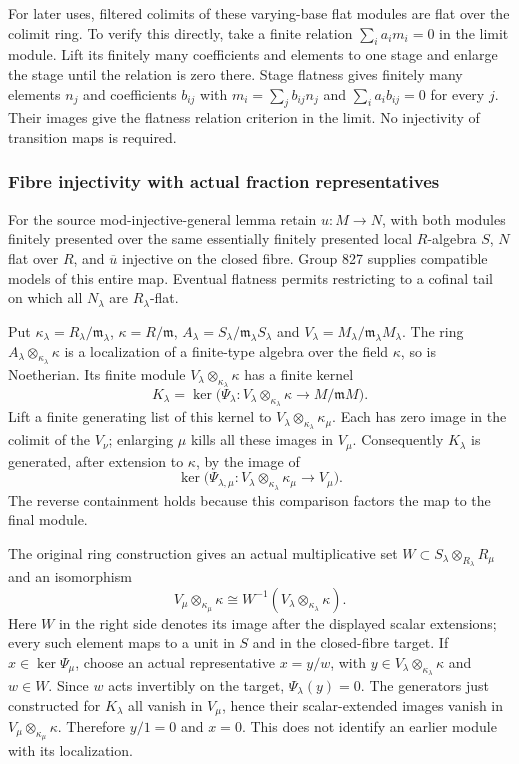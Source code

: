 For later uses, filtered colimits of these varying-base flat modules are flat over the colimit ring. To verify this directly, take a finite relation \(\sum_i a_i m_i=0\) in the limit module. Lift its finitely many coefficients and elements to one stage and enlarge the stage until the relation is zero there. Stage flatness gives finitely many elements \(n_j\) and coefficients \(b_{ij}\) with \(m_i=\sum_jb_{ij}n_j\) and \(\sum_i a_i b_{ij}=0\) for every \(j\). Their images give the flatness relation criterion in the limit. No injectivity of transition maps is required.

\subsubsection{Fibre injectivity with actual fraction representatives}\label{algebra-proof-038-fibre-injectivity-with-actual-fraction-representatives}

For the source mod-injective-general lemma retain \(u:M\to N\), with both modules finitely presented over the same essentially finitely presented local \(R\)-algebra \(S\), \(N\) flat over \(R\), and \(\overline u\) injective on the closed fibre. Group 827 supplies compatible models of this entire map. Eventual flatness permits restricting to a cofinal tail on which all \(N_\lambda\) are \(R_\lambda\)-flat.

Put \(\kappa_\lambda=R_\lambda/\mathfrak m_\lambda\), \(\kappa=R/\mathfrak m\), \(A_\lambda=S_\lambda/\mathfrak m_\lambda S_\lambda\) and \(V_\lambda=M_\lambda/\mathfrak m_\lambda M_\lambda\). The ring \(A_\lambda\otimes_{\kappa_\lambda}\kappa\) is a localization of a finite-type algebra over the field \(\kappa\), so is Noetherian. Its finite module \(V_\lambda\otimes_{\kappa_\lambda}\kappa\) has a finite kernel \[
K_\lambda=\ker\bigl(\Psi_\lambda:
 V_\lambda\otimes_{\kappa_\lambda}\kappa\longrightarrow M/\mathfrak mM\bigr).
\] Lift a finite generating list of this kernel to \(V_\lambda\otimes_{\kappa_\lambda}\kappa_\mu\). Each has zero image in the colimit of the \(V_\nu\); enlarging \(\mu\) kills all these images in \(V_\mu\). Consequently \(K_\lambda\) is generated, after extension to \(\kappa\), by the image of \[
\ker\bigl(\Psi_{\lambda,\mu}:
 V_\lambda\otimes_{\kappa_\lambda}\kappa_\mu\longrightarrow V_\mu\bigr).
\] The reverse containment holds because this comparison factors the map to the final module.

The original ring construction gives an actual multiplicative set \(W\subset S_\lambda\otimes_{R_\lambda}R_\mu\) and an isomorphism \[
V_\mu\otimes_{\kappa_\mu}\kappa
 \cong W^{-1}(V_\lambda\otimes_{\kappa_\lambda}\kappa).
\] Here \(W\) in the right side denotes its image after the displayed scalar extensions; every such element maps to a unit in \(S\) and in the closed-fibre target. If \(x\in\ker\Psi_\mu\), choose an actual representative \(x=y/w\), with \(y\in V_\lambda\otimes_{\kappa_\lambda}\kappa\) and \(w\in W\). Since \(w\) acts invertibly on the target, \(\Psi_\lambda(y)=0\). The generators just constructed for \(K_\lambda\) all vanish in \(V_\mu\), hence their scalar-extended images vanish in \(V_\mu\otimes_{\kappa_\mu}\kappa\). Therefore \(y/1=0\) and \(x=0\). This does not identify an earlier module with its localization.

